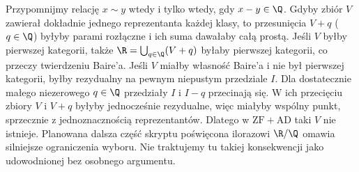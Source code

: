 \begin{przyklad}
\label{ex:ad-vitali}
Przypomnijmy relację $x\sim y$ wtedy i tylko wtedy, gdy
$x-y\in\Q$. Gdyby zbiór $V$ zawierał dokładnie jednego
reprezentanta każdej klasy, to przesunięcia $V+q$
($q\in\Q$) byłyby parami rozłączne i ich suma dawałaby
całą prostą. Jeśli $V$ byłby pierwszej kategorii, także
$\R=\bigcup_{q\in\Q}(V+q)$ byłaby pierwszej kategorii,
co przeczy twierdzeniu Baire'a. Jeśli $V$ miałby własność
Baire'a i nie był pierwszej kategorii, byłby rezydualny
na pewnym niepustym przedziale $I$. Dla dostatecznie
małego niezerowego $q\in\Q$ przedziały $I$ i $I-q$
przecinają się. W ich przecięciu zbiory $V$ i $V+q$
byłyby jednocześnie rezydualne, więc miałyby wspólny
punkt, sprzecznie z jednoznacznością reprezentantów.
Dlatego w $\mathrm{ZF}+\mathrm{AD}$ taki $V$ nie istnieje.
Planowana dalsza część skryptu poświęcona
ilorazowi $\R/\Q$ omawia silniejsze
ograniczenia wyboru. Nie traktujemy tu
takiej konsekwencji jako udowodnionej
bez osobnego argumentu.
\end{przyklad}

